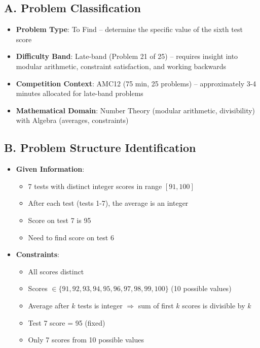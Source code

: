 \documentclass[11pt]{article}
\begin{document}
\begin{problemconfigbox}
\subsection*{A. Problem Classification}
\begin{itemize}[leftmargin=*]
    \item \textbf{Problem Type}: To Find -- determine the specific value of the sixth test score
    \item \textbf{Difficulty Band}: Late-band (Problem 21 of 25) -- requires insight into modular arithmetic, constraint satisfaction, and working backwards
    \item \textbf{Competition Context}: AMC12 (75 min, 25 problems) -- approximately 3-4 minutes allocated for late-band problems
    \item \textbf{Mathematical Domain}: Number Theory (modular arithmetic, divisibility) with Algebra (averages, constraints)
\end{itemize}

\subsection*{B. Problem Structure Identification}
\begin{itemize}[leftmargin=*]
    \item \textbf{Given Information}: 
    \begin{itemize}
        \item 7 tests with distinct integer scores in range $[91, 100]$
        \item After each test (tests 1-7), the average is an integer
        \item Score on test 7 is 95
        \item Need to find score on test 6
    \end{itemize}
    
    \item \textbf{Constraints}: 
    \begin{itemize}
        \item All scores distinct
        \item Scores $\in \{91, 92, 93, 94, 95, 96, 97, 98, 99, 100\}$ (10 possible values)
        \item Average after $k$ tests is integer $\Rightarrow$ sum of first $k$ scores is divisible by $k$
        \item Test 7 score = 95 (fixed)
        \item Only 7 scores from 10 possible values
    \end{itemize}
    

\end{itemize}
\end{problemconfigbox}
\end{document}
